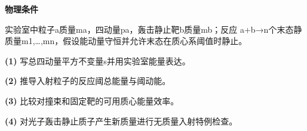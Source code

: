 \textbf{物理条件}\par 实验室中粒子a质量ma，四动量pa，轰击静止靶b质量mb；反应 a+b→n个末态静质量m1,…,mn，假设能动量守恒并允许末态在质心系阈值时静止。
\par\noindent\textbf{(1)} 写总四动量平方不变量s并用实验室能量表达。
\par\noindent\textbf{(2)} 推导入射粒子的反应阈总能量与阈动能。
\par\noindent\textbf{(3)} 比较对撞束和固定靶的可用质心能量效率。
\par\noindent\textbf{(4)} 对光子轰击静止质子产生新质量进行无质量入射特例检查。
